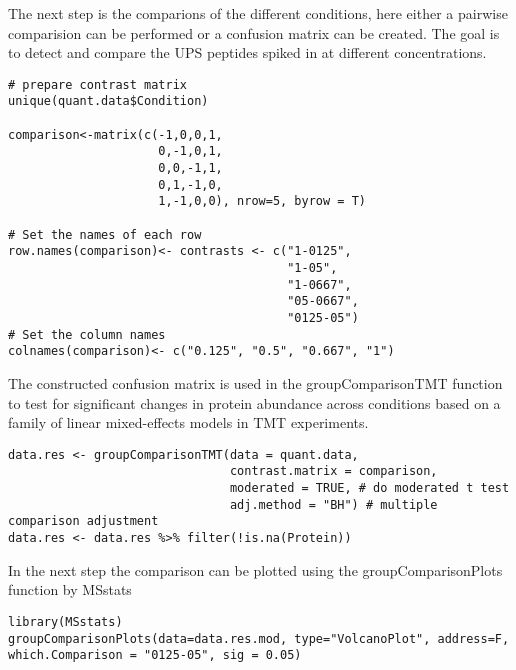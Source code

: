 \noindent The next step is the comparions of the different conditions, here either a pairwise comparision can be performed or a confusion matrix can be created. The goal is to detect and compare the UPS peptides spiked in at different concentrations. 

\begin{code}
\begin{verbatim}
# prepare contrast matrix
unique(quant.data$Condition)

comparison<-matrix(c(-1,0,0,1,
                     0,-1,0,1,
                     0,0,-1,1,
                     0,1,-1,0,
                     1,-1,0,0), nrow=5, byrow = T)
                     
# Set the names of each row
row.names(comparison)<- contrasts <- c("1-0125",   
                                       "1-05",  
                                       "1-0667",
                                       "05-0667",
                                       "0125-05")
# Set the column names
colnames(comparison)<- c("0.125", "0.5", "0.667", "1")

\end{verbatim}
\end{code}

\noindent The constructed confusion matrix is used in the groupComparisonTMT function to test for significant changes in protein abundance across conditions based on a family of linear mixed-effects models in TMT experiments. 

\begin{code}
\begin{verbatim}
data.res <- groupComparisonTMT(data = quant.data, 
                               contrast.matrix = comparison,
                               moderated = TRUE, # do moderated t test
                               adj.method = "BH") # multiple comparison adjustment
data.res <- data.res %>% filter(!is.na(Protein))
\end{verbatim}
\end{code}

\noindent  In the next step the comparison can be plotted using the groupComparisonPlots function by MSstats

\begin{code}
\begin{verbatim}
library(MSstats)
groupComparisonPlots(data=data.res.mod, type="VolcanoPlot", address=F, which.Comparison = "0125-05", sig = 0.05)
\end{verbatim}
\end{code}

